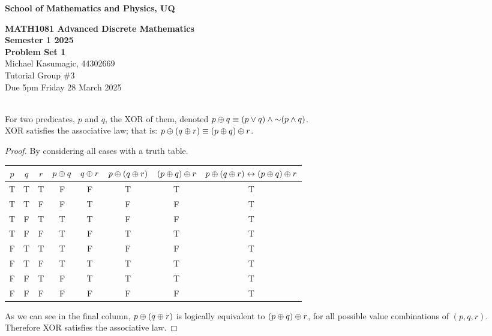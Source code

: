 \documentclass[a4paper,12pt]{report}
\begin{document}
\begin{center}
{\bf School of Mathematics and Physics, UQ}
\end{center}
\begin{center}
	{\large\bf MATH1081 Advanced Discrete Mathematics \\ Semester 1 2025 \\ Problem Set 1} \\ \vspace{1em}
	Michael Kasumagic, 44302669 \\
	Tutorial Group \#3 \\
	Due 5pm Friday 28 March 2025
\end{center}

\sol \\
 For two predicates, $p$ and $q$, the \textsf{XOR} of them, denoted $p\oplus q \equiv (p\lor q) \land \mathord{\sim}(p\land q)$. \\

 \textsf{XOR} satisfies the associative law; that is: $p\oplus (q\oplus r) \equiv (p\oplus q)\oplus r$.
\begin{proof}
	By considering all cases with a truth table. 
	\begin{center}\begin{tabular}{|ccc|cc|cc|c|}
		\hline
		$p$ & $q$ & $r$ & $p\oplus q$ & $q\oplus r$ & $p\oplus(q\oplus r)$ & $(p\oplus q)\oplus r$ & $p\oplus(q\oplus r)\leftrightarrow(p\oplus q)\oplus r$ \\ \hline 
		T & T & T & F & F & T & T	& T \\
		T & T & F & F & T & F & F	& T \\
		T & F & T & T & T & F & F	& T \\
		T & F & F & T & F & T & T	& T \\
		F & T & T & T & F & F & F	& T \\
		F & T & F & T & T & T & T	& T \\
		F & F & T & F & T & T & T	& T \\
		F & F & F & F & F & F & F	& T \\ \hline
	\end{tabular}\end{center}
	As we can see in the final column, $p\oplus(q\oplus r)$ is logically equivalent to $(p\oplus q)\oplus r$, for all possible value combinations of $(p,q,r)$. \\
	Therefore \textsf{XOR} satisfies the associative law.
\end{proof}
\end{document}
